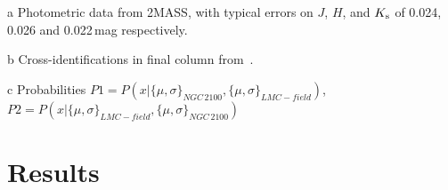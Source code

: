 \begin{table}
\begin{center}
\begin{threeparttable}
\begin{tabular}{lrccccccl }
\hline
\end{tabular}
\begin{tablenotes}
\item [a] Photometric data from 2MASS, with typical errors on $J$, $H$, and $K_{\rm s}$ of 0.024, 0.026 and 0.022\,mag respectively.
\item [b] Cross-identifications in final column from~\cite{1974A&AS...15..261R}.
\item [c] Probabilities $P1=P(x|\{\mu, \sigma\}_{NGC\,2100}, \{\mu, \sigma\}_{LMC-field})$,\\
                        $P2=P(x|\{\mu, \sigma\}_{LMC-field}, \{\mu, \sigma\}_{NGC\,2100})$
\end{tablenotes}
\end{threeparttable}
\end{center}
\end{table}


\section{Results} %
\label{sec:results}



